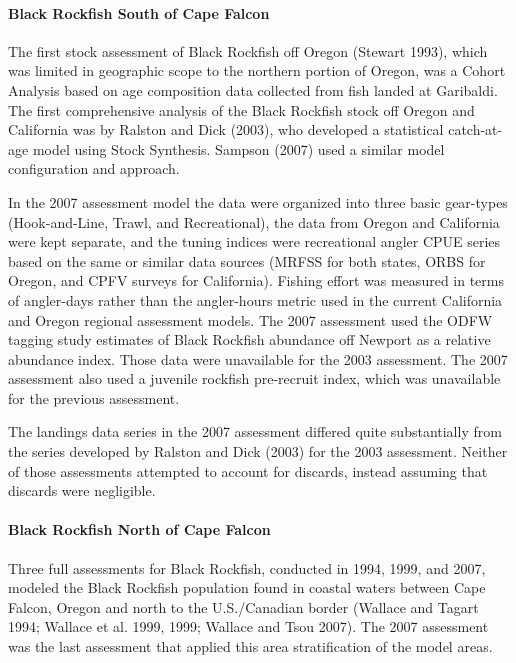 \documentclass[11pt,
  english,
  letterpaper,
]{article}
\begin{document}
\hypertarget{black-rockfish-south-of-cape-falcon}{%
\paragraph{Black Rockfish South of Cape Falcon}\label{black-rockfish-south-of-cape-falcon}}

The first stock assessment of Black Rockfish off Oregon (Stewart 1993), which was limited in geographic scope to the northern portion of Oregon, was a Cohort Analysis based on age composition data collected from fish landed at Garibaldi. The first comprehensive analysis of the Black Rockfish stock off Oregon and California was by Ralston and Dick (2003), who developed a statistical catch-at-age model using Stock Synthesis. Sampson (2007) used a similar model configuration and approach.

In the 2007 assessment model the data were organized into three basic gear-types (Hook-and-Line, Trawl, and Recreational), the data from Oregon and California were kept separate, and the tuning indices were recreational angler CPUE series based on the same or similar data sources (MRFSS for both states, ORBS for Oregon, and CPFV surveys for California). Fishing effort was measured in terms of angler-days rather than the angler-hours metric used in the current California and Oregon regional assessment models. The 2007 assessment used the ODFW tagging study estimates of Black Rockfish abundance off Newport as a relative abundance index. Those data were unavailable for the 2003 assessment. The 2007 assessment also used a juvenile rockfish pre-recruit index, which was unavailable for the previous assessment.

The landings data series in the 2007 assessment differed quite substantially from the series developed by Ralston and Dick (2003) for the 2003 assessment. Neither of those assessments attempted to account for discards, instead assuming that discards were negligible.

\hypertarget{black-rockfish-north-of-cape-falcon}{%
\paragraph{Black Rockfish North of Cape Falcon}\label{black-rockfish-north-of-cape-falcon}}

Three full assessments for Black Rockfish, conducted in 1994, 1999, and 2007, modeled the Black Rockfish population found in coastal waters between Cape Falcon, Oregon and north to the U.S./Canadian border (Wallace and Tagart 1994; Wallace et al. 1999, 1999; Wallace and Tsou 2007). The 2007 assessment was the last assessment that applied this area stratification of the model areas.
\end{document}

